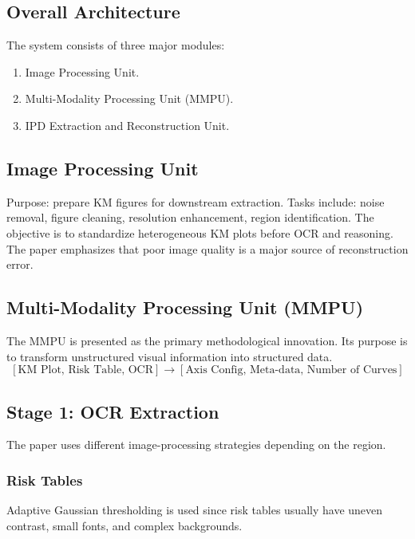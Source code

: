 \documentclass[11pt]{article}
\begin{document}
\subsection*{Overall Architecture}

The system consists of three major modules:

\begin{enumerate}
    \item Image Processing Unit.
    \item Multi-Modality Processing Unit (MMPU).
    \item IPD Extraction and Reconstruction Unit.
\end{enumerate}

\subsection*{Image Processing Unit}

Purpose: prepare KM figures for downstream extraction. Tasks include: noise removal, figure cleaning, resolution enhancement, region identification. The objective is to standardize heterogeneous KM plots before OCR and reasoning. The paper emphasizes that poor image quality is a major source of reconstruction error.

\subsection*{Multi-Modality Processing Unit (MMPU)}

The MMPU is presented as the primary methodological innovation. Its purpose is to transform unstructured visual information into structured data.
\[[\text{KM Plot, Risk Table, OCR}] \rightarrow [\text{Axis Config, Meta-data, Number of Curves}]\]

\subsection*{Stage 1: OCR Extraction}

The paper uses different image-processing strategies depending on the region.

\subsubsection*{Risk Tables}

Adaptive Gaussian thresholding is used since risk tables usually have uneven contrast, small fonts, and complex backgrounds. 
\end{document}
